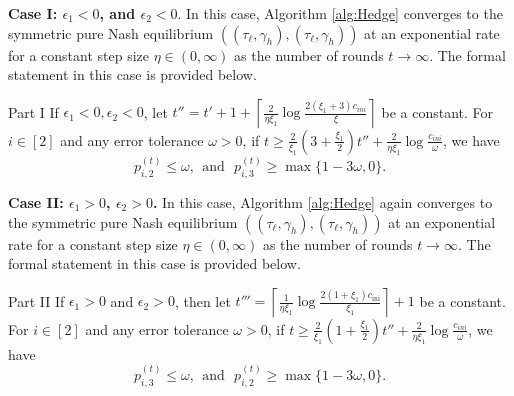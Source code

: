 
\noindent \textbf{Case I: $\epsilon_1<0$, and $\epsilon_2<0$}. In this case, Algorithm \ref{alg:Hedge} converges to the symmetric pure Nash equilibrium $((\tau_{\ell},\gamma_{h}),(\tau_{\ell},\gamma_{h}))$ at an exponential rate for a constant step size $\eta \in (0,\infty)$ as the number of rounds $t \to \infty$. 
The formal statement in this case is provided below.
\begin{theoremfour}{Part I}
\label{thm:converge}
If $\epsilon_1<0,\epsilon_2<0$, let 
$t''=t'+1+\left\lceil\frac{2}{\eta\xi_1}\log\frac{2(\xi_1+3)c_{ini}}{\xi}\right\rceil$ be a constant. For $i\in[2]$ and any error tolerance $\omega>0$, if $t\geq \frac{2}{\xi_1}(3+\frac{\xi_1}{2})t''+\frac{2}{\eta\xi_1}\log \frac{c_{ini}}{\omega}$, we have 
$$ p^{(t)}_{i,2}\leq \omega, \ \ \text{and}\ \ \  p^{(t)}_{i,3}\geq \max\{1-3\omega,0\}.$$
\end{theoremfour}

\noindent \textbf{Case II: $\epsilon_1>0$, $\epsilon_2>0$.} In this case, Algorithm \ref{alg:Hedge} again converges to the symmetric pure Nash equilibrium $((\tau_{\ell},\gamma_{h}),(\tau_{\ell},\gamma_{h}))$ at an exponential rate for a constant step size $\eta \in (0,\infty)$ as the number of rounds $t \to \infty$. 
The formal statement in this case is provided below.

\begin{theoremfour}{Part II}
If $\epsilon_1>0$ and $\epsilon_2>0$, then let $t'''=\left\lceil\frac{1}{\eta\xi_1}\log\frac{2(1+\xi_1)c_{\text{ini}}}{\xi_1}\right\rceil+1$ be a constant. For $i\in[2]$ and any error tolerance $\omega>0$, if $t\geq \frac{2}{\xi_1}(1+\frac{\xi_1}{2})t''+\frac{2}{\eta\xi_1}\log \frac{c_{ini}}{\omega}$, we have 
$$ p^{(t)}_{i,3}\leq \omega, \ \ \text{and}\ \ \  p^{(t)}_{i,2}\geq \max\{1-3\omega,0\}.$$
\end{theoremfour}

